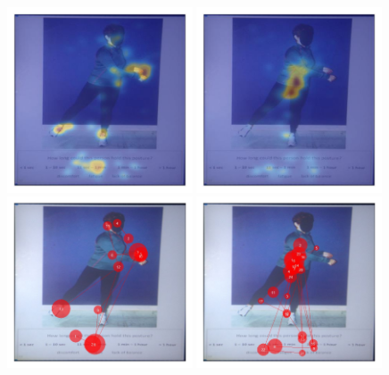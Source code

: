 \documentclass[11pt]{asaproc}
\begin{document}
\begin{figure}[t]
\begin{center} 
\includegraphics[width=0.49\textwidth]{figures/Kayd_heatmap_posture17.jpg} \hspace{1pt}
\includegraphics[width=0.49\textwidth]{figures/Subject13_heatmap_posture17.jpg}
\includegraphics[width=0.49\textwidth]{figures/Kayd_scanpath_posture17.jpg} \hspace{1pt}
\includegraphics[width=0.49\textwidth]{figures/Subject13_scanpath_posture17.jpg}	

\end{center}
\end{figure}
\end{document}
